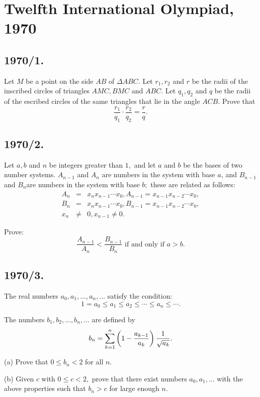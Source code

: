 \documentclass[12pt,thmsa]{article}
\begin{document}
\section{Twelfth International Olympiad, 1970}

\subsection{1970/1.}

Let $M$ be a point on the side $AB$ of $\Delta ABC.$ Let $r_{1},r_{2}$ and $r
$ be the radii of the inscribed circles of triangles $AMC,BMC$ and $ABC.$
Let $q_{1},q_{2}$ and $q$ be the radii of the escribed circles of the same
triangles that lie in the angle $ACB.$ Prove that
\[
\frac{r_{1}}{q_{1}}\cdot \frac{r_{2}}{q_{2}}=\frac{r}{q}.
\]

\subsection{1970/2.}

Let $a,b$ and $n$ be integers greater than $1,$ and let $a$ and $b$ be the
bases of two number systems. $A_{n-1}$ and $A_{n}$ are numbers in the system
with base $a$, and $B_{n-1}$ and $B_{n}$are numbers in the system with base $%
b;$ these are related as follows:
\begin{eqnarray*}
A_{n} &=&x_{n}x_{n-1}\cdots x_{0},A_{n-1}=x_{n-1}x_{n-2}\cdots x_{0}, \\
B_{n} &=&x_{n}x_{n-1}\cdots x_{0},B_{n-1}=x_{n-1}x_{n-2}\cdots x_{0}, \\
x_{n} &\neq &0,x_{n-1}\neq 0.
\end{eqnarray*}

Prove:
\[
\frac{A_{n-1}}{A_{n}}<\frac{B_{n-1}}{B_{n}}\text{ if and only if }a>b.
\]

\subsection{1970/3.}

The real numbers $a_{0},a_{1},...,a_{n},...$ satisfy the condition:
\[
1=a_{0}\leq a_{1}\leq a_{2}\leq \cdots \leq a_{n}\leq \cdots .
\]

The numbers $b_{1},b_{2},...,b_{n},...$ are defined by
\[
b_{n}=\sum_{k=1}^{n}\left( 1-\frac{a_{k-1}}{a_{k}}\right) \frac{1}{\sqrt{%
a_{k}}}.
\]

(a) Prove that $0\leq b_{n}<2$ for all $n.$

(b) Given $c$ with $0\leq c<2,$ prove that there exist numbers $%
a_{0},a_{1},...$ with the above properties such that $b_{n}>c$ for large
enough $n.$
\end{document}
